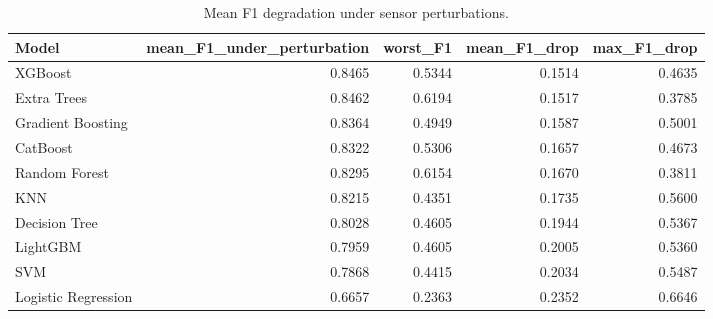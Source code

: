 \begin{table}
\caption{Mean F1 degradation under sensor perturbations.}
\label{tab:robust}
\begin{tabular}{lrrrr}
\toprule
Model & mean\_F1\_under\_perturbation & worst\_F1 & mean\_F1\_drop & max\_F1\_drop \\
\midrule
XGBoost & 0.8465 & 0.5344 & 0.1514 & 0.4635 \\
Extra Trees & 0.8462 & 0.6194 & 0.1517 & 0.3785 \\
Gradient Boosting & 0.8364 & 0.4949 & 0.1587 & 0.5001 \\
CatBoost & 0.8322 & 0.5306 & 0.1657 & 0.4673 \\
Random Forest & 0.8295 & 0.6154 & 0.1670 & 0.3811 \\
KNN & 0.8215 & 0.4351 & 0.1735 & 0.5600 \\
Decision Tree & 0.8028 & 0.4605 & 0.1944 & 0.5367 \\
LightGBM & 0.7959 & 0.4605 & 0.2005 & 0.5360 \\
SVM & 0.7868 & 0.4415 & 0.2034 & 0.5487 \\
Logistic Regression & 0.6657 & 0.2363 & 0.2352 & 0.6646 \\
\bottomrule
\end{tabular}
\end{table}
